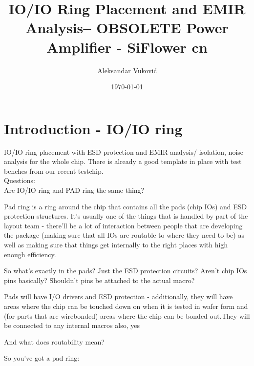\documentclass{article}
\title{ IO/IO Ring Placement and EMIR Analysis-- OBSOLETE Power Amplifier - SiFlower cn} %
\author{Aleksandar Vuković} %
\date{\today} %
\begin{document}
\maketitle %


\section*{Introduction - IO/IO ring} %

IO/IO ring placement with ESD protection and EMIR analysis/ isolation, noise analysis for the whole chip. There is already a good template in place with test benches from our recent testchip. \\

Questions: \\

Are IO/IO ring and PAD ring the same thing? 

\begin{info}

	Pad ring is a ring around the chip that contains all the pads (chip IOs) and ESD protection structures. It's usually one of the things that is handled by part of the layout team - there'll be a lot of interaction between people that are developing the package (making sure that all IOs are routable to where they need to be) as well as making sure that things get internally to the right places with high enough efficiency.

\end{info}

So what's exactly in the pads? Just the ESD protection circuits? Aren't chip IOs pins basically? Shouldn't pins be attached to the actual macro?

\begin{info}
	Pads will have I/O drivers and ESD protection - additionally, they will have areas where the chip can be touched down on when it is tested in wafer form and (for parts that are wirebonded) areas where the chip can be bonded out.They will be connected to any internal macros also, yes
\end{info}


And what does routability mean?



So you've got a pad ring:
\end{document}

